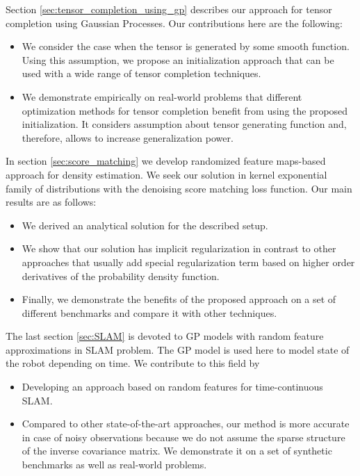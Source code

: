 Section \ref{sec:tensor_completion_using_gp} describes our approach for
tensor completion using Gaussian Processes.
Our contributions here are the following:
\begin{itemize}
    \item We consider the case when the tensor is generated by some smooth function.
    Using this assumption, we propose an initialization approach that
    can be used with a wide range of tensor completion techniques.
    \item We demonstrate empirically on real-world problems that different optimization methods
    for tensor completion benefit from using the proposed initialization.
    It considers assumption about tensor generating function and, therefore, allows to increase generalization power.
\end{itemize}
In section \ref{sec:score_matching} we develop randomized feature maps-based approach for density estimation.
We seek our solution in kernel exponential family of distributions with the denoising score matching loss function.
Our main results are as follows:
\begin{itemize}
    \item We derived an analytical solution for the described setup.
    \item We show that our solution has implicit regularization in contrast
    to other approaches that usually add special regularization term based on higher
    order derivatives of the probability density function.
    \item Finally, we demonstrate the benefits of the proposed approach on a set of different
    benchmarks and compare it with other techniques.
\end{itemize}
The last section \ref{sec:SLAM} is devoted to GP models with random feature approximations
in SLAM problem.
The GP model is used here to model state of the robot depending on time.
We contribute to this field by
\begin{itemize}
    \item Developing an approach based on random features for time-continuous SLAM.
    \item Compared to other state-of-the-art approaches, our method is more accurate
    in case of noisy observations because we do not assume the sparse structure of the
    inverse covariance matrix. We demonstrate it on a set of synthetic benchmarks
    as well as real-world problems.
\end{itemize}